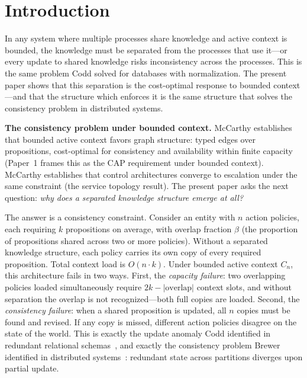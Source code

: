\documentclass[11pt]{article}
\theoremstyle{definition}
\theoremstyle{remark}
\begin{document}
\section{Introduction}
\label{sec:intro}

In any system where multiple processes share knowledge and active
context is bounded, the knowledge must be separated from the
processes that use it---or every update to shared knowledge risks
inconsistency across the processes. This is the same problem Codd
solved for databases with normalization. The present paper shows that
this separation is the cost-optimal response to bounded context---and
that the structure which enforces it is the same structure that
solves the consistency problem in distributed systems.

\textbf{The consistency problem under bounded context.}
McCarthy \cite{McCarthy2026a} establishes that bounded active context
favors graph structure: typed edges over propositions, cost-optimal for
consistency and availability within finite capacity
(Paper~1 frames this as the CAP requirement under bounded context).
McCarthy \cite{McCarthy2026c} establishes that control architectures
converge to escalation under the same constraint (the service topology
result). The present paper asks the next question: \emph{why does a
separated knowledge structure emerge at all?}

The answer is a consistency constraint. Consider an entity with $n$
action policies, each requiring $k$ propositions on average, with
overlap fraction $\beta$ (the proportion of propositions shared across
two or more policies). Without a separated knowledge structure, each
policy carries its own copy of every required proposition. Total
context load is $O(n \cdot k)$. Under bounded active context $C_n$,
this architecture fails in two ways. First, the \emph{capacity
failure}: two overlapping policies loaded simultaneously require
$2k - |\text{overlap}|$ context slots, and without separation the
overlap is not recognized---both full copies are loaded. Second, the
\emph{consistency failure}: when a shared proposition is updated, all
$n$ copies must be found and revised. If any copy is missed, different
action policies disagree on the state of the world. This is exactly
the update anomaly Codd identified in redundant relational
schemas~\cite{Codd1970}, and exactly the consistency problem Brewer
identified in distributed systems~\cite{Brewer2000}: redundant state
across partitions diverges upon partial update.
\end{document}
